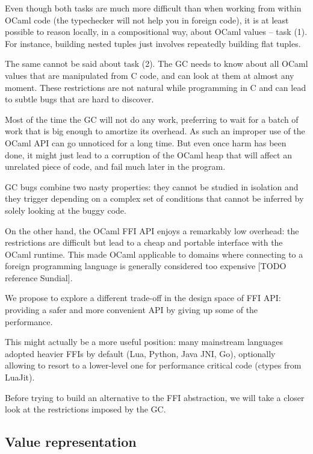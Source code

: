 \documentclass[a4paper]{easychair}
\begin{document}
Even though both tasks are much more difficult than when working from
within OCaml code (the typechecker will not help you in foreign code),
it is at least possible to reason locally, in a compositional way, about
OCaml values -- task (1). For instance, building nested tuples just
involves repeatedly building flat tuples.

The same cannot be said about task (2). The GC needs to know about all
OCaml values that are manipulated from C code, and can look at them at
almost any moment. These restrictions are not natural while programming
in C and can lead to subtle bugs that are hard to discover.

Most of the time the GC will not do any work, preferring to wait for a
batch of work that is big enough to amortize its overhead. As such an
improper use of the OCaml API can go unnoticed for a long time. But even
once harm has been done, it might just lead to a corruption of the OCaml
heap that will affect an unrelated piece of code, and fail much later in
the program.

GC bugs combine two nasty properties: they cannot be studied in
isolation and they trigger depending on a complex set of conditions that
cannot be inferred by solely looking at the buggy code.

On the other hand, the OCaml FFI API enjoys a remarkably low overhead:
the restrictions are difficult but lead to a cheap and portable
interface with the OCaml runtime. This made OCaml applicable to domains
where connecting to a foreign programming language is generally
considered too expensive {[}TODO reference Sundial{]}.

We propose to explore a different trade-off in the design space of FFI
API: providing a safer and more convenient API by giving up some of the
performance.

This might actually be a more useful position: many mainstream languages
adopted heavier FFIs by default (Lua, Python, Java JNI, Go), optionally
allowing to resort to a lower-level one for performance critical code
(ctypes from LuaJit).

Before trying to build an alternative to the FFI abstraction, we will
take a closer look at the restrictions imposed by the GC.

\hypertarget{value-representation}{%
\subsection{Value representation}\label{value-representation}}
\end{document}
